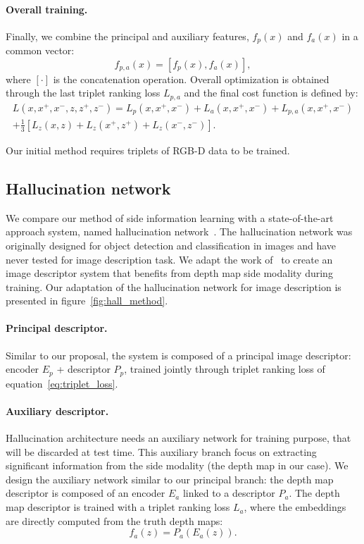 \paragraph{Overall training.}
Finally, we combine the principal and auxiliary features, $f_p(x)$ and $f_a(x)$ in a common vector:
\begin{equation}
	\label{eq:concat_desc}
	f_{p,a}(x) = \left[ f_p(x), f_a(x)  \right],
\end{equation}
where $[ \cdot ]$ is the concatenation operation. Overall optimization is obtained through the last triplet ranking loss $L_{p,a}$ and the final cost function is defined by:
\begin{multline}
	\label{eq:overall_loss}
	L(x, x^+, x^-,z, z^+, z^-) = L_p(x, x^+, x^-) + L_a(x, x^+, x^-) + L_{p,a}(x, x^+, x^-)\\
	 + \frac{1}{3}\left[ L_z(x, z) + L_z(x^+, z^+) + L_z(x^-, z^-) \right].
\end{multline}

Our initial method requires triplets of RGB-D data to be trained.

\subsection{Hallucination network}


We compare our method of side information learning with a state-of-the-art approach system, named hallucination network~\citep{Hoffman2016}. The hallucination network was originally designed for object detection and classification in images and have never tested for image description task. We adapt the work of~\citet{Hoffman2016} to create an image descriptor system that benefits from depth map side modality during training. Our adaptation of the hallucination network for image description is presented in figure~\ref{fig:hall_method}.

\paragraph{Principal descriptor.}
Similar to our proposal, the system is composed of a principal image descriptor: encoder $E_p$ + descriptor $P_p$, trained jointly through triplet ranking loss of equation~\ref{eq:triplet_loss}.

\paragraph{Auxiliary descriptor.}
Hallucination architecture needs an auxiliary network for training purpose, that will be discarded at test time. This auxiliary branch focus on extracting significant information from the side modality (the depth map in our case). We design the auxiliary network similar to our principal branch: the depth map descriptor is composed of an encoder $E_a$ linked to a descriptor $P_a$. The depth map descriptor is trained with a triplet ranking loss $L_a$, where the embeddings are directly computed from the truth depth maps:
\begin{equation}
	f_a(z) = P_a(E_a(z)).
\end{equation}

